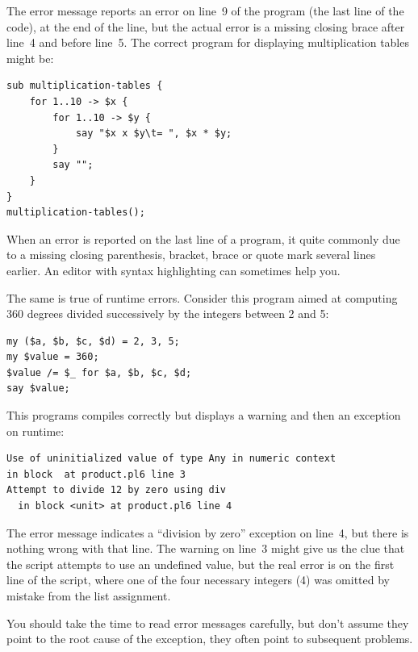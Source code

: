 The error message reports an error on line~9 of the program 
(the last line of the code), at the end of the line, but 
the actual error is a 
missing closing brace after line~4 and before line~5. The
correct program for displaying multiplication 
tables might be:

\begin{verbatim}
sub multiplication-tables {
    for 1..10 -> $x {
        for 1..10 -> $y {
            say "$x x $y\t= ", $x * $y;
        }
        say "";
    }
}
multiplication-tables();
\end{verbatim}

When an error is reported on the last line of a program, 
it quite commonly due to a missing closing parenthesis, 
bracket, brace or quote mark several lines earlier. An editor with 
syntax highlighting can sometimes help you.


The same is true of runtime errors. Consider this program aimed at computing 360 degrees divided successively by the integers between 2 and 5:

\begin{verbatim}
my ($a, $b, $c, $d) = 2, 3, 5;
my $value = 360;
$value /= $_ for $a, $b, $c, $d;
say $value;
\end{verbatim}

This programs compiles correctly but displays a warning and 
then an exception on runtime:

\begin{verbatim}
Use of uninitialized value of type Any in numeric context 
in block  at product.pl6 line 3
Attempt to divide 12 by zero using div
  in block <unit> at product.pl6 line 4
\end{verbatim}
%

The error message indicates a ``division by zero'' exception 
on line~4, but there is nothing wrong with that line. 
The warning on line~3 might give us the clue that the 
script attempts to use an undefined value, but the real error 
is on the first line of the script, where one of the four 
necessary integers (4) was omitted by mistake from the list 
assignment.


You should take the time to read error messages carefully, 
but don't assume they point to the root cause of the 
exception, they often point to subsequent problems.


